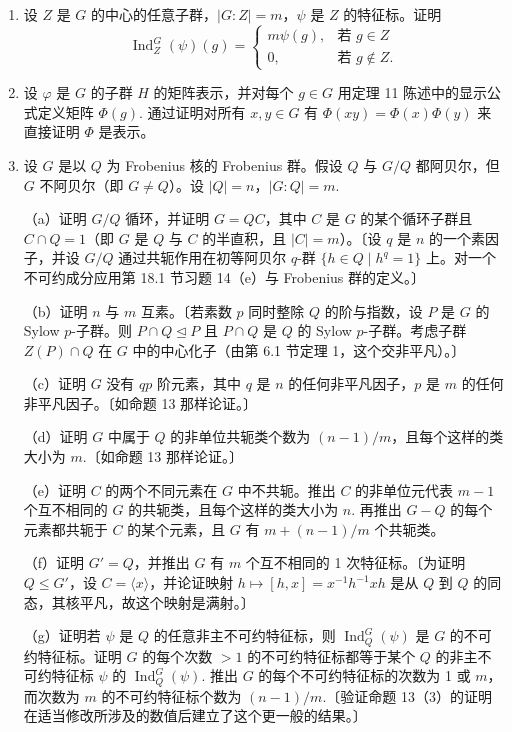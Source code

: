 \begin{enumerate}
\item 设 \(Z\) 是 \(G\) 的中心的任意子群，\(|G : Z| = m\)，\(\psi\) 是 \(Z\) 的特征标。证明
\[
\operatorname{Ind}_Z^G(\psi)(g) = \begin{cases}m\psi(g), & \text{若 } g \in Z\\ 0, & \text{若 } g \notin Z.\end{cases}
\]

\item 设 \(\varphi\) 是 \(G\) 的子群 \(H\) 的矩阵表示，并对每个 \(g \in G\) 用定理 11 陈述中的显示公式定义矩阵 \(\Phi(g)\). 通过证明对所有 \(x, y \in G\) 有 \(\Phi(xy) = \Phi(x)\Phi(y)\) 来直接证明 \(\Phi\) 是表示。

\item 设 \(G\) 是以 \(Q\) 为 Frobenius 核的 Frobenius 群。假设 \(Q\) 与 \(G/Q\) 都阿贝尔，但 \(G\) 不阿贝尔（即 \(G \neq Q\)）。设 \(|Q| = n\)，\(|G : Q| = m\).

（a）证明 \(G/Q\) 循环，并证明 \(G = QC\)，其中 \(C\) 是 \(G\) 的某个循环子群且 \(C \cap Q = 1\)（即 \(G\) 是 \(Q\) 与 \(C\) 的半直积，且 \(|C| = m\)）。〔设 \(q\) 是 \(n\) 的一个素因子，并设 \(G/Q\) 通过共轭作用在初等阿贝尔 \(q\)-群 \(\{h \in Q \mid h^q = 1\}\) 上。对一个不可约成分应用第 18.1 节习题 14（e）与 Frobenius 群的定义。〕

（b）证明 \(n\) 与 \(m\) 互素。〔若素数 \(p\) 同时整除 \(Q\) 的阶与指数，设 \(P\) 是 \(G\) 的 Sylow \(p\)-子群。则 \(P \cap Q \trianglelefteq P\) 且 \(P \cap Q\) 是 \(Q\) 的 Sylow \(p\)-子群。考虑子群 \(Z(P) \cap Q\) 在 \(G\) 中的中心化子（由第 6.1 节定理 1，这个交非平凡）。〕

（c）证明 \(G\) 没有 \(qp\) 阶元素，其中 \(q\) 是 \(n\) 的任何非平凡因子，\(p\) 是 \(m\) 的任何非平凡因子。〔如命题 13 那样论证。〕

（d）证明 \(G\) 中属于 \(Q\) 的非单位共轭类个数为 \((n-1)/m\)，且每个这样的类大小为 \(m\).〔如命题 13 那样论证。〕

（e）证明 \(C\) 的两个不同元素在 \(G\) 中不共轭。推出 \(C\) 的非单位元代表 \(m-1\) 个互不相同的 \(G\) 的共轭类，且每个这样的类大小为 \(n\). 再推出 \(G-Q\) 的每个元素都共轭于 \(C\) 的某个元素，且 \(G\) 有 \(m+(n-1)/m\) 个共轭类。

（f）证明 \(G' = Q\)，并推出 \(G\) 有 \(m\) 个互不相同的 1 次特征标。〔为证明 \(Q \leq G'\)，设 \(C = \langle x\rangle\)，并论证映射 \(h \mapsto [h,x] = x^{-1}h^{-1}xh\) 是从 \(Q\) 到 \(Q\) 的同态，其核平凡，故这个映射是满射。〕

（g）证明若 \(\psi\) 是 \(Q\) 的任意非主不可约特征标，则 \(\operatorname{Ind}_Q^G(\psi)\) 是 \(G\) 的不可约特征标。证明 \(G\) 的每个次数 \(>1\) 的不可约特征标都等于某个 \(Q\) 的非主不可约特征标 \(\psi\) 的 \(\operatorname{Ind}_Q^G(\psi)\). 推出 \(G\) 的每个不可约特征标的次数为 1 或 \(m\)，而次数为 \(m\) 的不可约特征标个数为 \((n-1)/m\).〔验证命题 13（3）的证明在适当修改所涉及的数值后建立了这个更一般的结果。〕


\end{enumerate}
